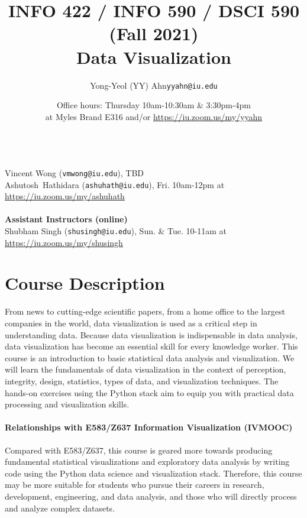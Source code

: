 \documentclass[11pt,article,oneside]{memoir} %
\makeatletter
\def\myauthor{Author}
\def\mytitle{Title}
\def\myaddress{\url{https://iu.zoom.us/my/yyahn}}
\def\myemail{yyahn@iu.edu}
\def\myauthor{Yong-Yeol (YY) Ahn}
\def\mytitle{{\normalsize INFO 422 / INFO 590 / DSCI 590 (Fall 2021)} \\ \HUGE{} Data Visualization}
\makeatother
\begin{document}

\title{\LARGE \mytitle} %
\author{\Large\myauthor\newline \footnotesize\texttt{\noindent\myemail } }
\date{Office hours: Thursday 10am-10:30am \& 3:30pm-4pm\\ at Myles Brand E316 and/or \myaddress}


\maketitle 

\vspace{-20pt}{\bfseries Assistant Instructors (residential)} \\ %
Vincent Wong (\texttt{vmwong@iu.edu}), TBD\\
Ashutosh Hathidara (\texttt{ashuhath@iu.edu}), Fri. 10am-12pm at \url{https://iu.zoom.us/my/ashuhath}\\\\
{\bfseries Assistant Instructors (online)}\\  
Shubham Singh (\texttt{shusingh@iu.edu}), Sun. \& Tue. 10-11am at \url{https://iu.zoom.us/my/shusingh}\\


\section{Course Description}%

From news to cutting-edge scientific papers, from a home office to the largest companies in the world, data visualization is used as a critical step in understanding data. 
Because data visualization is indispensable in data analysis, data visualization has become an essential skill for every knowledge worker.  
This course is an introduction to basic statistical data analysis and visualization.  
We will learn the fundamentals of data visualization in the context of perception, integrity, design, statistics, types of data, and visualization techniques.  
The hands-on exercises using the Python stack aim to equip you with practical data processing and visualization skills. 

\paragraph{Relationships with E583/Z637 Information Visualization (IVMOOC)} Compared with E583/Z637, this course is geared more towards producing fundamental statistical visualizations and exploratory data analysis by writing code using the Python data science and visualization stack.  
Therefore, this course may be more suitable for students who pursue their careers in research, development, engineering, and data analysis, and those who will directly process and analyze complex datasets. 
\end{document}
